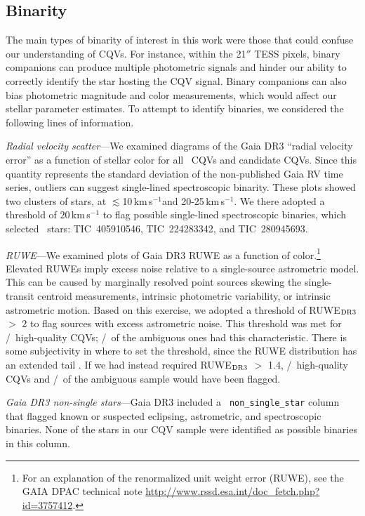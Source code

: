 \documentclass[11pt,twocolumn,tighten]{aastex63}
\newcommand{\kms}{{km\,s$^{-1}$}}
\begin{document}
\subsection{Binarity}
\label{subsec:binarity}

The main types of binarity of interest in this work were those that
could confuse our understanding of CQVs.  For instance, within the
21$''$ TESS pixels, binary companions can produce multiple photometric
signals and hinder our ability to correctly identify the star hosting
the CQV signal.  Binary companions can also bias photometric magnitude
and color measurements, which would affect our stellar parameter
estimates.  To attempt to identify binaries, we considered the
following lines of information.

{\it Radial velocity scatter}---We examined diagrams of the Gaia DR3
``radial velocity error'' as a function of stellar color for all
\ncqvsnodebunked\ CQVs and candidate CQVs.  Since this quantity
represents the standard deviation of the non-published Gaia RV time
series, outliers can suggest single-lined spectroscopic binarity.
These plots showed two clusters of stars, at $\lesssim$10\,\kms and
20-25\,\kms.  We there adopted a threshold of $20$\,km\,s$^{-1}$ to
flag possible single-lined spectroscopic binaries, which selected
\nrvscatterflag\ stars: TIC~405910546, TIC~224283342, and
TIC~280945693.

{\it RUWE}---We examined plots of Gaia DR3 RUWE as a function of
color.\footnote{For an explanation of the renormalized unit weight
error (RUWE), see the GAIA DPAC technical note
\url{http://www.rssd.esa.int/doc_fetch.php?  id=3757412}.}  Elevated
RUWEs imply excess noise relative to a single-source astrometric
model.  This can be caused by marginally resolved point sources
skewing the single-transit centroid measurements,  intrinsic
photometric variability, or intrinsic astrometric motion.  Based on
this exercise, we adopted a threshold of RUWE$_{\rm DR3}$ $>$ 2 to
flag sources with excess astrometric noise.  This threshold was met
for \ngoodhighruwe/\ngoods\ high-quality CQVs;
\nmaybehighruwe/\nmaybes\ of the ambiguous ones had this
characteristic.  There is some subjectivity in where to set the
threshold, since the RUWE distribution has an extended tail
\citep[e.g.][]{2022MNRAS.513.5270P}.  If we had instead required
RUWE$_{\rm DR3}$ $>$ 1.4, \ngoodweakruwe/\ngoods\ high-quality CQVs
and \nmaybeweakruwe/\nmaybes\ of the ambiguous sample would have been
flagged.

{\it Gaia DR3 non-single stars}---Gaia DR3 included a {\tt
non\_single\_star} column that flagged known or suspected eclipsing,
astrometric, and spectroscopic binaries.  None of the stars in our CQV
sample were identified as possible binaries in this column.
\end{document}
